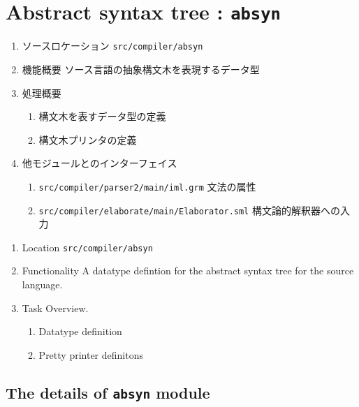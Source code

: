 \documentclass{jbook}
\newcommand{\txt}[2]{#2}
\newcommand{\code}[1]{\mbox{\large\tt #1}}
\begin{document}
\else%
\fi%

% 
\chapter{\txt
{抽象構文木データ構造：\code{absyn}}
{Abstract syntax tree : \code{absyn}}
}
\label{chap:Absyn}

\ifjp%
\begin{enumerate}
\item ソースロケーション \code{src/compiler/absyn}
\item 機能概要 ソース言語の抽象構文木を表現するデータ型
\item 処理概要
\begin{enumerate}
\item 構文木を表すデータ型の定義
\item 構文木プリンタの定義
\end{enumerate}
\item 他モジュールとのインターフェイス
\begin{enumerate}
\item \code{src/compiler/parser2/main/iml.grm} 文法の属性
\item \code{src/compiler/elaborate/main/Elaborator.sml} 構文論的解釈器への入力
\end{enumerate}
\end{enumerate}
\else%
\begin{enumerate}
\item Location
	 \code{src/compiler/absyn}
\item Functionality
	A datatype defintion for the abstract syntax tree for the source
language.
\item Task Overview.
\begin{enumerate}
\item Datatype definition
\item Pretty printer definitons
\end{enumerate}
\end{enumerate}
\fi%

\section{\txt{\code{absyn}モジュールの処理の詳細}{The details of \code{absyn} module}}
\end{document}
